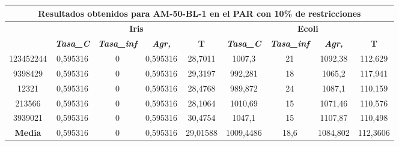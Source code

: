 \documentclass[12pt, spanish]{article}
\begin{document}
\begin{table}[H]
\footnotesize
\begin{tabular}{|c|c|c|c|c|c|c|c|c|}
\hline
\multicolumn{9}{|c|}{\textbf{Resultados obtenidos para AM-50-BL-1 en el PAR con 10\% de restricciones}}                                                                                                           \\ \hline
\multirow{2}{*}{} & \multicolumn{4}{c|}{\textbf{Iris}}                                                            & \multicolumn{4}{c|}{\textbf{Ecoli}}                                                           \\ \cline{2-9} 
                  & \textit{\textbf{Tasa\_C}} & \textit{\textbf{Tasa\_inf}} & \textit{\textbf{Agr,}} & \textbf{T} & \textit{\textbf{Tasa\_C}} & \textit{\textbf{Tasa\_inf}} & \textit{\textbf{Agr,}} & \textbf{T} \\ \hline
123452244         & 0,595316                  & 0                           & 0,595316               & 28,7011    & 1007,3                    & 21                          & 1092,38                & 112,629    \\ \hline
9398429           & 0,595316                  & 0                           & 0,595316               & 29,3197    & 992,281                   & 18                          & 1065,2                 & 117,941    \\ \hline
12321             & 0,595316                  & 0                           & 0,595316               & 28,4768    & 989,872                   & 24                          & 1087,1                 & 110,159    \\ \hline
213566            & 0,595316                  & 0                           & 0,595316               & 28,1064    & 1010,69                   & 15                          & 1071,46                & 110,576    \\ \hline
3939021           & 0,595316                  & 0                           & 0,595316               & 30,4754    & 1047,1                    & 15                          & 1107,87                & 110,498    \\ \hline
\textbf{Media}    & 0,595316                  & 0                           & 0,595316               & 29,01588   & 1009,4486                 & 18,6                        & 1084,802               & 112,3606   \\ \hline
\end{tabular}
\end{table}
\end{document}
